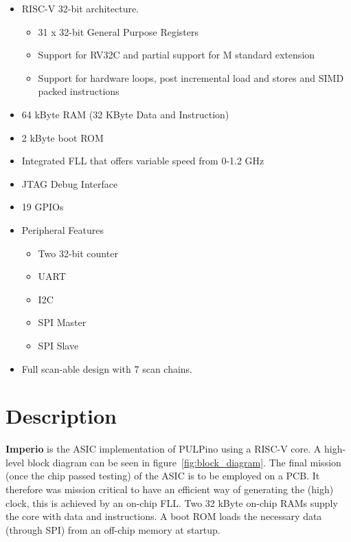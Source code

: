 \begin{itemize}
  \item RISC-V 32-bit architecture.
  \begin{itemize}
    \item 31 x 32-bit General Purpose Registers
    \item Support for RV32C and partial support for M standard extension
    \item Support for hardware loops, post incremental load and stores and SIMD packed instructions
  \end{itemize}
  \item 64 kByte RAM (32 KByte Data and Instruction)
  \item 2 kByte boot ROM
  \item Integrated FLL that offers variable speed from 0-1.2 GHz
  \item JTAG Debug Interface
  \item 19 GPIOs
  \item Peripheral Features
    \begin{itemize}
      \item Two 32-bit counter
      \item UART
      \item I2C
      \item SPI Master
      \item SPI Slave
    \end{itemize}
  \item Full scan-able design with 7 scan chains.
\end{itemize}



\section{Description}

\textbf{Imperio} is the ASIC implementation of PULPino using a RISC-V core. A high-level block diagram can be seen in figure~\ref{fig:block_diagram}. The final mission (once the chip passed testing) of the ASIC is to be employed on a PCB. It therefore was mission critical to have an efficient way of generating the (high) clock, this is achieved by an on-chip FLL. Two 32 kByte on-chip RAMs supply the core with data and instructions. A boot ROM loads the necessary data (through SPI) from an off-chip memory at startup.

